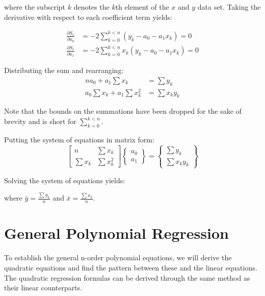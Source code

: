 \documentclass{../../KDHnotes}
\begin{document}
where the subscript $k$ denotes the $k$th element of the $x$ and $y$ data set.
Taking the derivative with respect to each coefficient term yields:

\begin{align}
	\frac{\partial S_r}{\partial a_0} &= -2 \sum_{k=0}^{k<n} (y_k - a_0 - a_1x_k) = 0 \\
	\frac{\partial S_r}{\partial a_1} &= -2 \sum_{k=0}^{k<n} x_k(y_k - a_0 - a_1x_k) = 0
\end{align}

Distributing the sum and rearranging:
\begin{align}
	na_0 + a_1 \sum x_k &= \sum y_k\\
	a_0 \sum x_k + a_1 \sum x_k^2 &= \sum x_k y_k
\end{align}

Note that the bounds on the summations have been dropped for the sake of brevity and is short for $\sum_{k=0}^{k<n}$.

Putting the system of equations in matrix form:
\begin{equation}
	\begin{bmatrix}
		n & \sum x_k\\
		\sum x_k & \sum x_k^2
	\end{bmatrix}
	\begin{Bmatrix}
		a_0\\ a_1
	\end{Bmatrix}
	=
	\begin{Bmatrix}
		\sum y_k\\
		\sum x_k y_k
	\end{Bmatrix}
\end{equation}


Solving the system of equations yields:

where $\bar{y}=\frac{\sum y_k}{n}$ and $\bar{x}=\frac{\sum x_k}{n}$.


\section{General Polynomial Regression}

To establish the general n-order polynomial equations, we will derive the quadratic equations and find the pattern between these and the linear equations.
The quadratic regression formulas can be derived through the same method as their linear counterparts.
\end{document}
